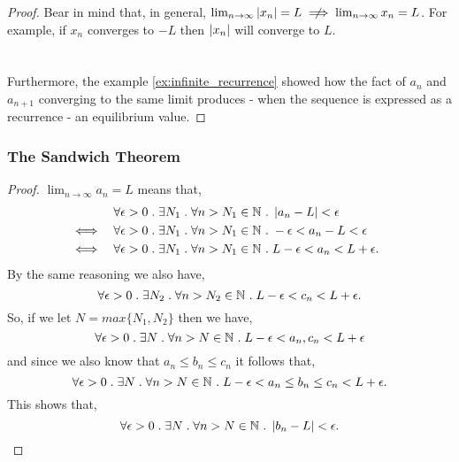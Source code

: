 \documentclass[../MathsNotesBase.tex]{subfiles}
\begin{document}
{\begin{proof}
			Bear in mind that, in general, ${ \lim_{n \to \infty} \abs{x_n} = L \centernot\implies \lim_{n \to \infty} x_n = L }$. For example, if $x_n$ converges to $-L$ then $\left\lvert x_n\right\rvert$ will converge to $L$.\\
			\href{https://github.com/mcopeland2001/maths-notes/blob/master/\resourceDir/code/python/converge_to_minus_2.py}{\scriptsize{}}\\\\
			
			Furthermore, the example \ref{ex:infinite_recurrence} showed how the fact of $a_n$ and $a_{n+1}$ converging to the same limit produces - when the sequence is expressed as a recurrence - an equilibrium value.
		\end{proof}
	
		\subsubsection{The Sandwich Theorem}
		\begin{proof}
			${ \lim_{n \to \infty} a_n = L }$ means that,
			\begin{align*}
			&& \forall \epsilon > 0 \;.\; \exists N_1 \;.\; \forall n > N_1 \in \mathbb{N}^{} &\;.\; \left\lvert a_n - L\right\rvert < \epsilon  &\text{\scriptsize{}} \\
			&\iff & \forall \epsilon > 0 \;.\; \exists N_1 \;.\; \forall n > N_1 \in \mathbb{N}^{} &\;.\; -\epsilon < a_n - L < \epsilon  &\text{\scriptsize{}} \\
			&\iff & \forall \epsilon > 0 \;.\; \exists N_1 \;.\; \forall n > N_1 \in \mathbb{N}^{} &\;.\; L - \epsilon < a_n < L + \epsilon.  &\text{\scriptsize{}}
			\end{align*}
			By the same reasoning we also have,
			\[ \forall \epsilon > 0 \;.\; \exists N_2 \;.\; \forall n > N_2 \in \mathbb{N}^{} \;.\; L - \epsilon < c_n < L + \epsilon. \]
			So, if we let ${ N = max\{N_1, N_2\} }$ then we have,
			\[ \forall \epsilon > 0 \;.\; \exists N \;.\; \forall n > N \in \mathbb{N}^{} \;.\; L - \epsilon < a_n, c_n < L + \epsilon \]
			and since we also know that ${ a_n \leq b_n \leq c_n }$ it follows that,
			\[ \forall \epsilon > 0 \;.\; \exists N \;.\; \forall n > N \in \mathbb{N}^{} \;.\; L - \epsilon < a_n \leq b_n \leq c_n < L + \epsilon. \]
			This shows that,
			\[ \forall \epsilon > 0 \;.\; \exists N \;.\; \forall n > N \in \mathbb{N}^{} \;.\; \left\lvert b_n - L\right\rvert < \epsilon. \]
		\end{proof}
	
}
\end{document}

